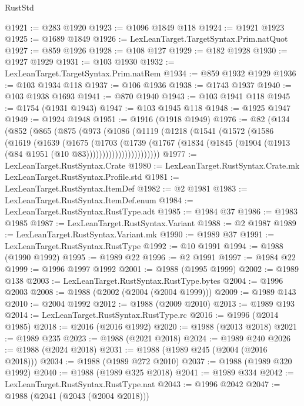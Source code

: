 \begin{lexlean}{RustStd}
\begin{coremodule}
@1921 := @283 @1920
@1923 := @1096 @1849 @118
@1924 := @1921 @1923
@1925 := @1689 @1849
@1926 := LexLeanTarget.TargetSyntax.Prim.natQuot
@1927 := @859 @1926
@1928 := @108 @127
@1929 := @182 @1928
@1930 := @1927 @1929
@1931 := @103 @1930
@1932 := LexLeanTarget.TargetSyntax.Prim.natRem
@1934 := @859 @1932 @1929
@1936 := @103 @1934 @118
@1937 := @106 @1936
@1938 := @1743 @1937
@1940 := @103 @1938 @1693
@1941 := @870 @1940
@1943 := @103 @1941 @118
@1945 := @1754 (@1931 @1943)
@1947 := @103 @1945 @118
@1948 := @1925 @1947
@1949 := @1924 @1948
@1951 := @1916 (@1918 @1949)
@1976 := @82
    (@134
      (@852
        (@865
          (@875
            (@973
              (@1086
                (@1119
                  (@1218
                    (@1541
                      (@1572
                        (@1586
                          (@1619
                            (@1639
                              (@1675
                                (@1703
                                  (@1739
                                    (@1767
                                      (@1834
                                        (@1845
                                          (@1904 (@1913 (@84 @1951 (@10 @83)))))))))))))))))))))))
@1977 := LexLeanTarget.RustSyntax.Crate
@1980 := LexLeanTarget.RustSyntax.Crate.mk LexLeanTarget.RustSyntax.Profile.std
@1981 := LexLeanTarget.RustSyntax.ItemDef
@1982 := @2 @1981
@1983 := LexLeanTarget.RustSyntax.ItemDef.enum
@1984 := LexLeanTarget.RustSyntax.RustType.adt
@1985 := @1984 @37
@1986 := @1983 @1985
@1987 := LexLeanTarget.RustSyntax.Variant
@1988 := @2 @1987
@1989 := LexLeanTarget.RustSyntax.Variant.mk
@1990 := @1989 @37
@1991 := LexLeanTarget.RustSyntax.RustType
@1992 := @10 @1991
@1994 := @1988 (@1990 @1992)
@1995 := @1989 @22
@1996 := @2 @1991
@1997 := @1984 @22
@1999 := @1996 @1997 @1992
@2001 := @1988 (@1995 @1999)
@2002 := @1989 @138
@2003 := LexLeanTarget.RustSyntax.RustType.bytes
@2004 := @1996 @2003
@2008 := @1988 (@2002 (@2004 (@2004 @1999)))
@2009 := @1989 @143
@2010 := @2004 @1992
@2012 := @1988 (@2009 @2010)
@2013 := @1989 @193
@2014 := LexLeanTarget.RustSyntax.RustType.rc
@2016 := @1996 (@2014 @1985)
@2018 := @2016 (@2016 @1992)
@2020 := @1988 (@2013 @2018)
@2021 := @1989 @235
@2023 := @1988 (@2021 @2018)
@2024 := @1989 @240
@2026 := @1988 (@2024 @2018)
@2031 := @1988 (@1989 @245 (@2004 (@2016 @2018)))
@2034 := @1988 (@1989 @272 @2010)
@2037 := @1988 (@1989 @320 @1992)
@2040 := @1988 (@1989 @325 @2018)
@2041 := @1989 @334
@2042 := LexLeanTarget.RustSyntax.RustType.nat
@2043 := @1996 @2042
@2047 := @1988 (@2041 (@2043 (@2004 @2018)))

\end{coremodule}
\end{lexlean}
